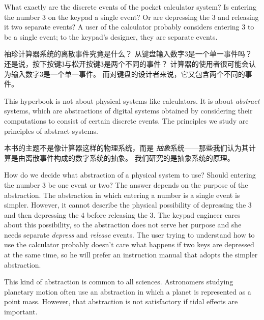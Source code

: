 \documentclass[fleqn,leqno]{article}
\begin{document}
\begin{en}
What exactly are the discrete events of the pocket calculator system?
Is entering the number 3 on the keypad a single event?  Or are
depressing the 3 and releasing it two separate events?  A user of the
calculator probably considers entering 3 to be a single event; to the
keypad's designer, they are separate events.  
\end{en}

\begin{ch}
  袖珍计算器系统的离散事件究竟是什么？
  从键盘输入数字$3$是一个单一事件吗？
  还是说，按下按键$3$与松开按键$3$是两个不同的事件？
  计算器的使用者很可能会认为输入数字$3$是一个单一事件。
  而对键盘的设计者来说，它又包含两个不同的事件。
\end{ch}

\begin{en}
This hyperbook is not about physical systems like calculators.  It is
about 
\emph{abstract} systems, which are abstractions of digital systems
obtained by considering their computations to consist of certain
discrete events.  The principles we study are principles of abstract
systems.
\end{en}

\begin{ch}
  本书的主题不是像计算器这样的物理系统，而是%
  \emph{抽象}系统——那些我们认为其计算是由离散事件构成的数字系统的抽象。
  我们研究的是抽象系统的原理。
\end{ch}

\begin{en}
How do we decide what abstraction of a physical system to use?  Should
entering the number 3 be one event or two?  The answer depends on the
purpose of the abstraction.  The abstraction in which entering a
number is a single event is simpler.  However, it cannot describe the
physical possibility of depressing the 3 and then depressing the 4
before releasing the 3.  The keypad engineer cares about this
possibility, so the abstraction does not serve her purpose and she
needs separate \emph{depress} and \emph{release} events.  The user
trying to understand how to use the calculator probably doesn't care
what happens if two keys are depressed at the same time, so he will
prefer an instruction manual that adopts the simpler abstraction.

This kind of abstraction is common to all sciences.  Astronomers
studying planetary motion often use an abstraction in which a
planet is represented as a point mass.  However, that abstraction is not
satisfactory if tidal effects are important.  
\end{en}
\end{document}

